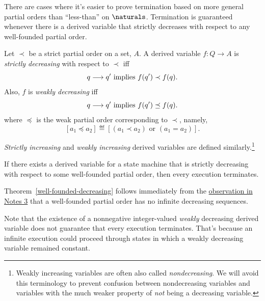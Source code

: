 \iffalse

There are cases where it's easier to prove termination based on more
general partial orders than ``less-than'' on $\naturals$.  Termination is
guaranteed whenever there is a derived variable that strictly decreases with
respect to any well-founded partial order.

\begin{definition}
Let $\prec$ be a strict partial order on a set, $A$.  A derived variable
$f : Q \to A$ is \emph{strictly decreasing} with respect to $\prec$ iff
\[
q \mathrel{\longrightarrow} q' \text{ implies } f(q') \prec f(q).
\]
Also, $f$ is \emph{weakly decreasing} iff
\[
q \mathrel{\longrightarrow} q' \text{  implies  } f(q') \preceq f(q).
\]
where $\preceq$ is the weak partial order corresponding to $\prec$,
namely,
\[
[a_1 \preceq a_2] \eqdef [(a_1 \prec a_2) \text{ or } (a_1=a_2)].
\]

\emph{Strictly increasing} and \emph{weakly increasing} derived variables
are defined similarly.\footnote{Weakly increasing variables are often also
called \emph{nondecreasing}.  We will avoid this terminology to prevent
confusion between nondecreasing variables and variables with the much
weaker property of \emph{not} being a decreasing variable.}
\end{definition}

\begin{theorem}\label{well-founded-decreasing}
  If there exists a derived variable for a state machine that is strictly
  decreasing with respect to some well-founded partial order, then every
  execution terminates.
\end{theorem}

Theorem~\ref{well-founded-decreasing} follows immediately from the
\href{http://courses.csail.mit.edu/6.042/spring08/ln3.pdf#infinite.decreasing}
{observation in Notes 3} that a well-founded partial order has no infinite
decreasing sequences.

Note that the existence of a nonnegative integer-valued \emph{weakly}
decreasing derived variable does not guarantee that every execution
terminates.  That's because an infinite execution could proceed through
states in which a weakly decreasing variable remained constant.

